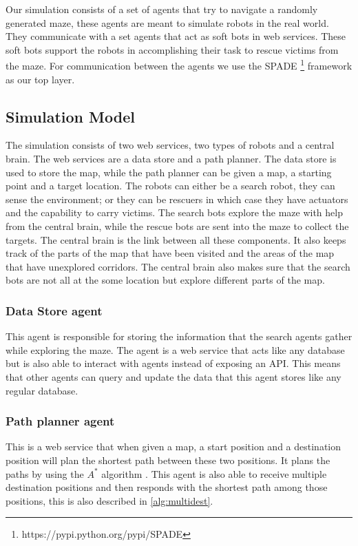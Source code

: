 Our simulation consists of a set of agents that try to navigate a randomly
generated maze, these agents are meant to simulate robots in the real world. 
They communicate with a set agents that act as soft bots in web services. These
soft bots support the robots in accomplishing their task to rescue victims from
the maze. For communication between the agents we use the SPADE \footnote{https://pypi.python.org/pypi/SPADE} framework as our top layer.

\subsection{Simulation Model}
The simulation consists of two web services, two types of robots and a
central brain. The web services are a data store and a path planner. The data
store is used to store the map, while the path planner can be given a map, a
starting point and a target location. The robots can either be a search robot,
they can sense the environment; or they can be rescuers in which case they have
actuators and the capability to carry victims. The search bots explore the maze
with help from the central brain, while the rescue bots are sent into the maze
to collect the targets. The central brain is the link between all these
components. It also keeps track of the parts of the map that have been visited
and the areas of the map that have unexplored corridors. The central brain also
makes sure that the search bots are not all at the some location but explore
different parts of the map.

\subsubsection{Data Store agent}
This agent is responsible for storing the information that the search agents
gather while exploring the maze. The agent is a web service that acts like any
database but is also able to interact with agents instead of exposing an API.
This means that other agents can query and update the data that this agent
stores like any regular database.

\subsubsection{Path planner agent}
This is a web service that when given a map, a start position and a destination
position will plan the shortest path between these two positions. It plans the
paths by using the $A^*$ algorithm \cite{astar}. This agent is also able to
receive multiple destination positions and then responds with the shortest path
among those positions, this is also described in \autoref{alg:multidest}.

